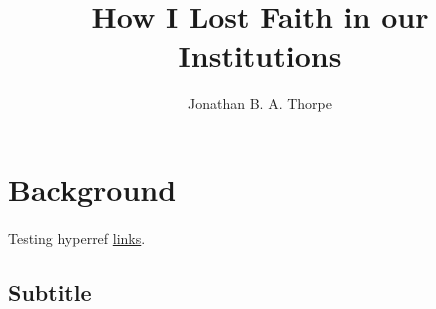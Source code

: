\documentclass[11pt,a4paper]{article}
\title{How I Lost Faith in our Institutions}
\author{Jonathan B. A. Thorpe}
\begin{document}

\maketitle

\section*{Background}

\paragraph{}
Testing hyperref \href{https://en.wikipedia.org/wiki/Main_Page}{links}.

\lipsum[1-3]


\subsection*{Subtitle}
\lipsum[4-5]
\end{document}
